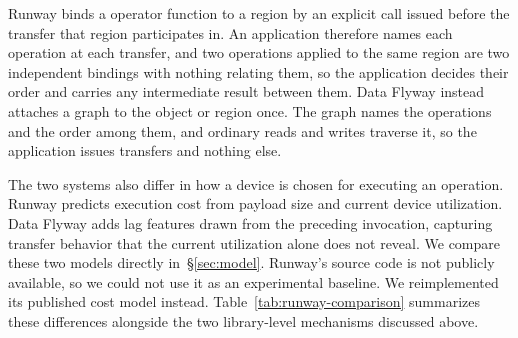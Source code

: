 Runway binds a operator function to a region by an explicit call issued before the transfer that region participates in. An application therefore names each operation at each transfer, and two operations applied to the same region are two independent bindings with nothing relating them, so the application decides their order and carries any intermediate result between them. Data Flyway instead attaches a graph to the object or region once. The graph names the operations and the order among them, and ordinary reads and writes traverse it, so the application issues transfers and nothing else.

The two systems also differ in how a device is chosen for executing an operation. Runway predicts execution cost from payload size and current device utilization. Data Flyway adds lag features drawn from the preceding invocation, capturing transfer behavior that the current utilization alone does not reveal. We compare these two models directly in~\S\ref{sec:model}. Runway's source code is not publicly available, so we could not use it as an experimental baseline. We reimplemented its published cost model instead. Table~\ref{tab:runway-comparison} summarizes these differences alongside the two library-level mechanisms discussed above.

\newcommand{\Full}{\textcolor{fullsupport}{\checkmark}}
\newcommand{\Partial}{\textcolor{partialsupport}{$\bigcirc$}}
\newcommand{\None}{$\times$}
\newcommand{\rot}[1]{\rotatebox[origin=l]{90}{#1}}
\newcommand{\fr}[1]{\hspace{1em}#1}

